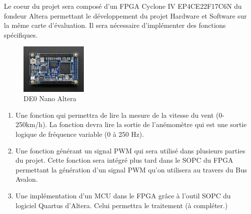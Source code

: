Le coeur du projet sera composé d'un FPGA Cyclone IV EP4CE22F17C6N du fondeur Altera permettant le développement du projet Hardware et Software sur la même carte d'évaluation. Il sera nécessaire d'implémenter des fonctions spécifiques.
\begin{figure}
    \begin{center}
      \includegraphics[angle=90, width=0.29\textwidth]{images/DE0.jpg}
      \caption{DE0 Nano Altera}
    \end{center}
  \end{figure}  
\begin{enumerate}
    \item Une fonction qui permettra de lire la mesure de la vitesse du vent (0-250km/h). La fonction devra lire la sortie de l'anémomètre qui est une sortie logique de fréquence variable (0 à 250 Hz). 
    \item Une fonction générant un signal PWM qui sera utilisé dans plusieurs parties du projet. Cette fonction sera intégré plus tard dans le SOPC du FPGA permettant la génération d'un signal PWM qu'on utilisera au travers du Bus Avalon.
    \item Une implémentation d'un MCU dans le FPGA grâce à l'outil SOPC du logiciel Quartus d'Altera. Celui permettra le traitement (à compléter.)
\end{enumerate}
